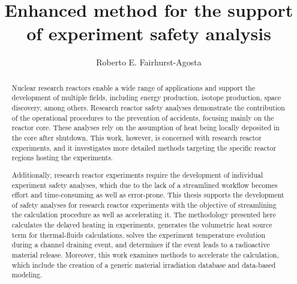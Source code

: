 \documentclass{uiucthesis2021}
\begin{document}
\title{Enhanced method for the support of experiment safety analysis}
\author{Roberto E. Fairhurst-Agosta}
\phdthesis
{}
\maketitle

\frontmatter

\begin{abstract}

Nuclear research reactors enable a wide range of applications and support the development of multiple fields, including energy production, isotope production, space discovery, among others.
Research reactor safety analyses demonstrate the contribution of the operational procedures to the prevention of accidents, focusing mainly on the reactor core.
These analyses rely on the assumption of heat being locally deposited in the core after shutdown.
This work, however, is concerned with research reactor experiments, and it investigates more detailed methods targeting the specific reactor regions hosting the experiments.


Additionally, research reactor experiments require the development of individual experiment safety analyses, which due to the lack of a streamlined workflow becomes effort and time-consuming as well as error-prone.
This thesis supports the development of safety analyses for research reactor experiments with the objective of streamlining the calculation procedure as well as accelerating it.
The methodology presented here calculates the delayed heating in experiments, generates the volumetric heat source term for thermal-fluids calculations, solves the experiment temperature evolution during a channel draining event, and determines if the event leads to a radioactive material release.
Moreover, this work examines methods to accelerate the calculation, which include the creation of a generic material irradiation database and data-based modeling.


\end{abstract}
\end{document}
